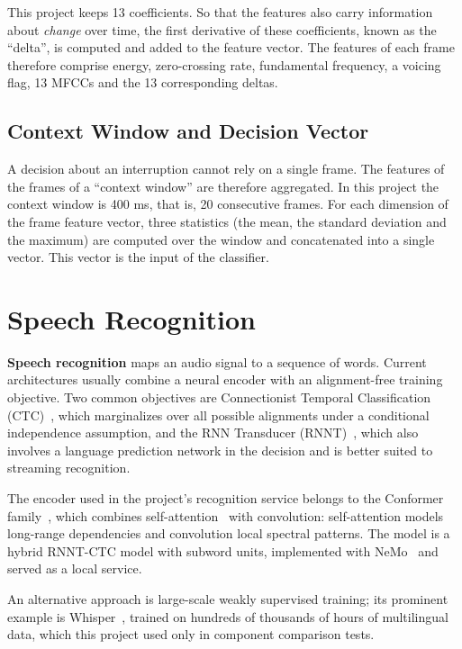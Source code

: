 This project keeps 13 coefficients. So that the features also carry information
about \emph{change} over time, the first derivative of these coefficients, known as
the ``delta'', is computed and added to the feature vector. The features of each
frame therefore comprise energy, zero-crossing rate, fundamental frequency, a
voicing flag, 13 MFCCs and the 13 corresponding deltas.

\subsection{Context Window and Decision Vector}

A decision about an interruption cannot rely on a single frame. The features of
the frames of a ``context window'' are therefore aggregated. In this project the
context window is 400 ms, that is, 20 consecutive frames. For each dimension of the
frame feature vector, three statistics (the mean, the standard deviation and the
maximum) are computed over the window and concatenated into a single vector.
This vector is the input of the classifier.

\section{Speech Recognition}
\label{sec:asr}

\textbf{Speech recognition} maps an audio signal to a sequence of words. Current
architectures usually combine a neural encoder with an alignment-free training
objective. Two common objectives are Connectionist Temporal Classification
(CTC)~\cite{graves2006ctc}, which marginalizes over all possible alignments under
a conditional independence assumption, and the RNN Transducer
(RNNT)~\cite{graves2012rnnt}, which also involves a language prediction network in
the decision and is better suited to streaming recognition.

The encoder used in the project's recognition service belongs to the Conformer
family~\cite{gulati2020conformer}, which combines
self-attention~\cite{vaswani2017attention} with convolution: self-attention models
long-range dependencies and convolution local spectral patterns. The model is a
hybrid RNNT-CTC model with subword units, implemented with
NeMo~\cite{kuchaiev2019nemo} and served as a local service.

An alternative approach is large-scale weakly supervised training; its prominent
example is Whisper~\cite{radford2023whisper}, trained on hundreds of thousands of
hours of multilingual data, which this project used only in component comparison
tests.

